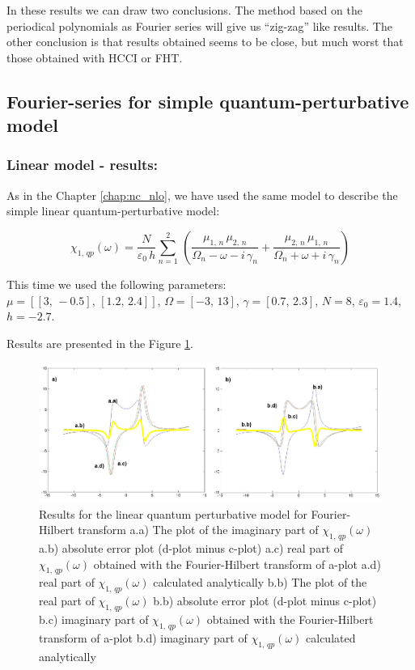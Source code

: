 \documentclass[12pt,twoside,a4paper]{article}
\numberwithin{equation}{subsection}
\numberwithin{figure}{subsection}
\begin{document}
In these results we can draw two conclusions. The method based on the periodical polynomials as Fourier series will
give us ``zig-zag'' like results. The other conclusion is that results obtained seems to be close, but much worst that those
obtained with HCCI or FHT. 

\subsection{Fourier-series for simple quantum-perturbative model} \label{chap:fourier_quantum}

\subsubsection*{Linear model - results:}

As in the Chapter \ref{chap:nc_nlo}, we have used the same model to describe the simple linear quantum-perturbative model: 

\begin{equation} \label{eq:four_qp}
  {\chi_{1, \,qp}}(\omega ) = \frac {N}{\varepsilon_0\,h} \sum_{n=1}^{2}\,(\frac {{\mu_{1, \,n}}\,{ \mu_{2, \,n}}}{{\Omega_{n}}
  - \omega  - i\,{\gamma_{n}}} + \frac {{\mu_{2, \,n}}\,{\mu_{1, \,n}}}{{\Omega_{n}} + \omega + i\,{\gamma_{n}}})
\end{equation}

This time we used the following parameters: \\
$\mu = [[3, \, - 0.5], \,[1.2, \,2.4]]$, 
$\Omega =[ - 3, \,13]$, 
$\gamma =[0.7, \,2.3]$,  
$N=8$, 
${\varepsilon_{0}}=1.4$, 
$h= - 2.7$.

Results are presented in the Figure \ref{fig:four_qp1}. 

\begin{figure}
  \includegraphics[width=150mm]{img/four_qp1.png}
  \caption{Results for the linear quantum perturbative model for Fourier-Hilbert transform
    a.a) The plot of the imaginary part of ${\chi_{1, \, qp}}(\omega )$
    a.b) absolute error plot (d-plot minus c-plot) 
    a.c) real part of ${\chi_{1, \, qp}}(\omega )$ obtained with the Fourier-Hilbert transform of a-plot 
    a.d) real part of ${\chi_{1, \, qp}}(\omega )$ calculated analytically 
    b.b) The plot of the real part of ${\chi_{1, \, qp}}(\omega )$ 
    b.b) absolute error plot (d-plot minus c-plot) 
    b.c) imaginary part of ${\chi_{1, \, qp}}(\omega )$ obtained with the Fourier-Hilbert transform of a-plot 
    b.d) imaginary part of ${\chi_{1, \, qp}}(\omega )$ calculated analytically  
    \label{fig:four_qp1}
  }
\end{figure}
\end{document}
